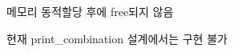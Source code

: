 
\begin{DoxyRefList}
\item[\label{bug__bug000001}%
\hypertarget{bug__bug000001}{}%
Global \hyperlink{hw07__07_8c_a50f0359b8b13ed31152c59df39fb28c2}{print\-\_\-combination} (char $\ast$list, int start\-Id, int length, int $\ast$is\-\_\-selected)]
\begin{DoxyItemize}
\item 메모리 동적할당 후에 free되지 않음
\item 현재 print\-\_\-combination 설계에서는 구현 불가
\end{DoxyItemize}
\end{DoxyRefList}